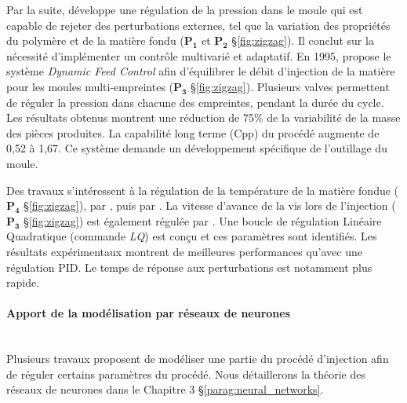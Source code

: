 Par la suite, \cite{fara_comprehensive_1990} développe une régulation de la pression dans le moule qui est capable de rejeter des perturbations externes, tel que la variation des propriétés du polymère et de la matière fondu ($\boldsymbol{P_1}$ et $\boldsymbol{P_2}$ §\ref{fig:zigzag}).
Il conclut sur la nécessité d'implémenter un contrôle multivarié et adaptatif.
En 1995, \cite{kazmer_dynamic_1995} propose le système \textit{Dynamic Feed Control} afin d'équilibrer le débit d'injection de la matière pour les moules multi-empreintes ($\boldsymbol{P_3}$ §\ref{fig:zigzag}).
Plusieurs valves permettent de réguler la pression dans chacune des empreintes, pendant la durée du cycle.
Les résultats obtenus montrent une réduction de 75\% de la variabilité de la masse des pièces produites.
La capabilité long terme (Cpp) du procédé augmente de 0,52 à 1,67.
Ce système demande un développement spécifique de l'outillage du moule.

Des travaux s'intéressent à la régulation de la température de la matière fondue ($\boldsymbol{P_4}$  §\ref{fig:zigzag}), par \cite{kamal_injection_1986, gomes_injection_1986}, puis par \cite{gustafson_model_1987}.
La vitesse d’avance de la vis lors de l’injection ($\boldsymbol{P_3}$ §\ref{fig:zigzag}) est également régulée par \cite{pandelidis_optimal_1988}.
Une boucle de régulation Linéaire Quadratique (commande \textit{LQ}) est conçu et ces paramètres sont identifiés.
Les résultats expérimentaux montrent de meilleures performances qu’avec une régulation PID.
Le temps de réponse aux perturbations est notamment plus rapide.

\paragraph{Apport de la modélisation par réseaux de neurones}\mbox{} \\
Plusieurs travaux proposent de modéliser une partie du procédé d'injection afin de réguler certains paramètres du procédé.
Nous détaillerons la théorie des réseaux de neurones dans le Chapitre 3 §\ref{parag:neural_networks}.

